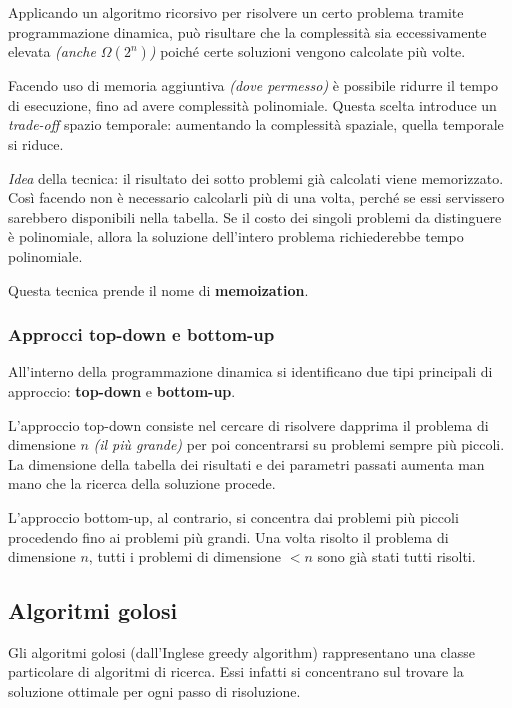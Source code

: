 \documentclass[italian, 10pt]{article}
\begin{document}
Applicando un algoritmo ricorsivo per risolvere un certo problema tramite programmazione dinamica, può risultare che la complessità sia eccessivamente elevata \textit{(anche \(\Omega(2^n)\))} poiché certe soluzioni vengono calcolate più volte.

Facendo uso di memoria aggiuntiva \textit{(dove permesso)} è possibile ridurre il tempo di esecuzione, fino ad avere complessità polinomiale.
Questa scelta introduce un \textit{trade-off} spazio temporale: aumentando la complessità spaziale, quella temporale si riduce.

\bigskip
\textit{Idea} della tecnica:
il risultato dei sotto problemi già calcolati viene memorizzato.
Così facendo non è necessario calcolarli più di una volta, perché se essi servissero sarebbero disponibili nella tabella.
Se il costo dei singoli problemi da distinguere è polinomiale, allora la soluzione dell'intero problema richiederebbe tempo polinomiale.

Questa tecnica prende il nome di \textbf{memoization}.

\subsubsection{Approcci top-down e bottom-up}

All'interno della programmazione dinamica si identificano due tipi principali di approccio: \textbf{top-down} e \textbf{bottom-up}.

L'approccio top-down consiste nel cercare di risolvere dapprima il problema di dimensione \(n\) \textit{(il più grande)} per poi concentrarsi su problemi sempre più piccoli.
La dimensione della tabella dei risultati e dei parametri passati aumenta man mano che la ricerca della soluzione procede.

L'approccio bottom-up, al contrario, si concentra dai problemi più piccoli procedendo fino ai problemi più grandi.
Una volta risolto il problema di dimensione \(n\), tutti i problemi di dimensione \(< n\) sono già stati tutti risolti.

\subsection{Algoritmi golosi}

Gli algoritmi golosi (dall'Inglese greedy algorithm) rappresentano una classe particolare di algoritmi di ricerca.
Essi infatti si concentrano sul trovare la soluzione ottimale per ogni passo di risoluzione.
\end{document}
